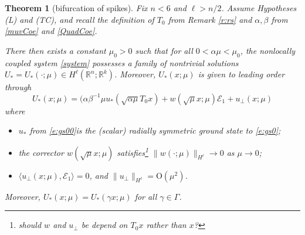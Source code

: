 \documentclass[10pt]{article}
\newtheorem{Theorem}{Theorem}
\newcommand{\R}{\mathbb{R}}
\newcommand{\rmO}{\mathrm{O}}
\newcommand{\rmo}{\mathrm{o}}
\newcommand{\K}{\mathcal{K}}
\begin{document}
\begin{Theorem}[bifurcation of spikes]\label{MainRes} Fix $n<6$ and $\ell>n/2$.  Assume Hypotheses (L) and (TC), and  recall the definition of $T_0$ from Remark \ref{r:rs} and $\alpha,\beta$ from \eqref{muvCoe} and \eqref{QuadCoe}.

There then exists a constant $\mu_0>0$ such that for all $0< \alpha\mu<\mu_0$, the nonlocally coupled system \eqref{system} possesses a  family of nontrivial solutions $U_*=U_*(\cdot;\mu) \in H^\ell(\R^n;\R^k)$. Moreover, $U_*(x;\mu)$ is given to leading order through
\begin{equation}\label{expan}
U_*(x;\mu) =  (\alpha\beta^{-1}\mu u_*(\sqrt{\alpha\mu} T_0 x)+w(\sqrt{\mu}x;\mu)\mathcal{E}_1 + u_{\perp}(x;\mu)
\end{equation}
where 
\begin{itemize}
\item $u_*$ from \eqref{e:gs00}is the  (scalar) radially symmetric ground state to \eqref{e:gs0};
\item the corrector $w(\sqrt{\mu} x;\mu)$ satisfies\footnote{should $w$ and $u_{\perp}$ be depend on $T_0x$ rather than $x$?}  $\|w(\cdot;\mu)\|_{H^\ell} \to 0$ as $\mu \to 0$;
\item $\langle u_{\perp}(x;\mu),\mathcal{E}_1\rangle=0$, and $\|u_{\perp}\|_{H^\ell} = \rmO(\mu^2)$.
\end{itemize}
Moreover, $U_*(x;\mu)=U_*(\gamma x;\mu)$ for all $\gamma\in\Gamma$. 
% 
% 
% 
\end{Theorem}
\end{document}
